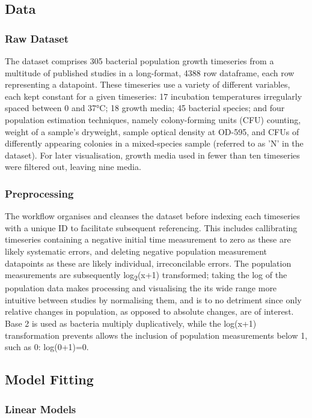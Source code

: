 \documentclass[11pt]{article}
\begin{document}
\subsection{Data}
\subsubsection{Raw Dataset}
 The dataset comprises 305 bacterial population growth timeseries from a multitude of published studies in a long-format, 4388 row dataframe, each row representing a datapoint. These timeseries use a variety of different variables, each kept constant for a given timeseries: 17 incubation temperatures irregularly spaced between 0 and 37°C; 18 growth media; 45 bacterial species; and four population estimation techniques, namely colony-forming units (CFU) counting, weight of a sample's dryweight, sample optical density at OD-595, and CFUs of differently appearing colonies in a mixed-species sample (referred to as 'N' in the dataset).\parencite{Al-qadiri2008} For later visualisation, growth media used in fewer than ten timeseries were filtered out, leaving nine media. 


\subsubsection{Preprocessing}
The workflow organises and cleanses the dataset before indexing each timeseries with a unique ID to facilitate subsequent referencing. This includes callibrating timeseries containing a negative initial time measurement to zero as these are likely systematic errors, and deleting negative population measurement datapoints as these are likely individual, irreconcilable errors. The population measurements are subsequently log\textsubscript{2}(x+1) transformed; taking the log of the population data makes processing and visualising the its wide range more intuitive between studies by normalising them, and is to no detriment since only relative changes in population, as opposed to absolute changes, are of interest. Base 2 is used as bacteria multiply duplicatively, while the log(x+1) transformation prevents allows the inclusion of population measurements below 1, such as 0: log(0+1)=0. 






\subsection{Model Fitting} 
\subsubsection{Linear Models}
\end{document}
